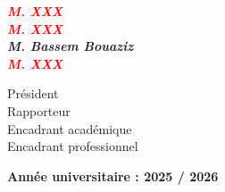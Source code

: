 \begin{titlepage}
\begin{minipage}{0.88\textwidth}
  \vspace{0.7cm}
  \begin{minipage}[t]{0.52\linewidth}
    \raggedright\bfseries\itshape
    \textcolor{red}{M. XXX}\\[3pt]
    \textcolor{red}{M. XXX}\\[3pt]
    M. Bassem Bouaziz\\[3pt]
    \textcolor{red}{M. XXX}
  \end{minipage}%
  \begin{minipage}[t]{0.46\linewidth}
    \raggedleft
    Président\\[3pt]
    Rapporteur\\[3pt]
    Encadrant académique\\[3pt]
    Encadrant professionnel
  \end{minipage}

  \vspace{1.3cm}
  {\bfseries\small Année universitaire : 2025 / 2026}
\end{minipage}
\end{titlepage}

\restoregeometry
